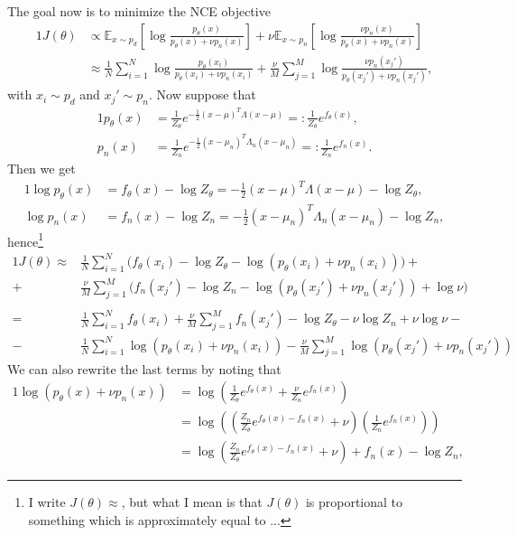 \documentclass[a4paper]{article}
\begin{document}
The goal now is to minimize the NCE objective
\begin{alignat*}{1}
J(\theta) &\propto \mathbb{E}_{x \sim p_d} \left[ \log \frac{p_\theta(x)}{p_\theta(x) + \nu p_n(x)}\right] + \nu \mathbb{E}_{x \sim p_n} \left[ \log \frac{ \nu p_n(x)}{p_\theta(x) + \nu p_n(x)}\right]\\
&\approx \frac{1}{N} \sum_{i=1}^N \log \frac{p_\theta(x_i)}{p_\theta(x_i) + \nu p_n(x_i)} + \frac{\nu}{M} \sum_{j=1}^{M} \log \frac{\nu p_n(x_j')}{p_\theta(x_j') + \nu p_n(x_j')},
\end{alignat*}
with $x_i \sim p_d$ and $x_j' \sim p_n$. Now suppose that
\begin{alignat*}{1}
p_\theta(x) &= \frac{1}{Z_\theta} e^{-\frac{1}{2}(x-\mu)^T\Lambda (x-\mu)} =: \frac{1}{Z_\theta} e^{f_\theta(x)},\\
p_n(x) &= \frac{1}{Z_n} e^{-\frac{1}{2}(x-\mu_n)^T \Lambda_n (x-\mu_n)} =: \frac{1}{Z_n}e^{f_n(x)}.
\end{alignat*}
Then we get
\begin{alignat*}{1}
\log p_\theta(x) &= f_\theta(x) - \log Z_\theta = -\frac{1}{2} (x-\mu)^T \Lambda (x-\mu) - \log Z_\theta,\\
\log p_n(x) &= f_n(x) - \log Z_n = -\frac{1}{2}(x-\mu_n)^T \Lambda_n (x-\mu_n) - \log Z_n,
\end{alignat*}
hence\footnote{I write $J(\theta) \approx$, but what I mean is that $J(\theta)$ is proportional to something which is approximately equal to ...}
\begin{alignat*}{1}
J(\theta) \approx &\frac{1}{N} \sum_{i=1}^N \Big( f_\theta(x_i) - \log Z_\theta - \log( p_\theta(x_i) + \nu p_n(x_i)) \Big) +\\
+ \ &\frac{\nu}{M} \sum_{j=1}^M \Big( f_n(x_j') - \log Z_n - \log( p_\theta(x_j') + \nu p_n(x_j')) + \log \nu\Big) \\
\\
= \ & \frac{1}{N} \sum_{i=1}^N  f_\theta(x_i)  + \frac{\nu}{M} \sum_{j=1}^M  f_n(x_j') - \log Z_\theta - \nu \log Z_n + \nu \log \nu -\\
- \ &  \frac{1}{N} \sum_{i=1}^N \log( p_\theta(x_i) + \nu p_n(x_i)) - \frac{\nu}{M} \sum_{j=1}^M  \log( p_\theta(x_j') + \nu p_n(x_j'))
\end{alignat*}
We can also rewrite the last terms by noting that
\begin{alignat}{1}
\label{eq1} \log( p_\theta(x) + \nu p_n(x)) &= \log\left( \frac{1}{Z_\theta} e^{f_\theta(x)} + \frac{\nu}{Z_n}e^{f_n(x)} \right)\\
\nonumber &= \log\left( \left( \frac{Z_n}{Z_\theta} e^{f_\theta(x)-f_n(x)} + \nu\right) \left( \frac{1}{Z_n} e^{f_n(x)}\right) \right)\\
\nonumber &= \log\left( \frac{Z_n}{Z_\theta} e^{f_\theta(x)-f_n(x)} + \nu\right) + f_n(x) - \log Z_n,
\end{alignat}
\end{document}
